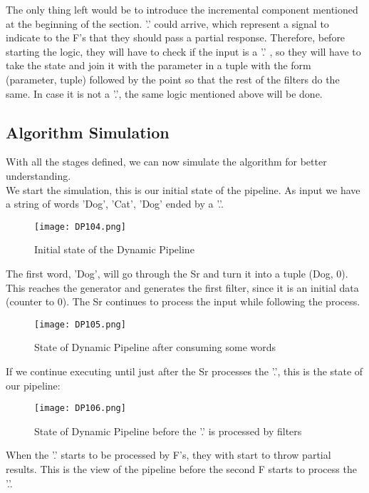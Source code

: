 The only thing left would be to introduce the incremental component mentioned at the beginning of the section.
'.' could arrive, which represent a signal to indicate to the F's that they should pass a partial response.
Therefore, before starting the logic, they will have to check if the input is a '.' , so they will have to take the state and join it with the parameter in a tuple with the form (parameter, tuple) followed by the point so that the rest of the filters do the same. In case it is not a '.', the same logic mentioned above will be done.

\subsection{Algorithm Simulation}
With all the stages defined, we can now simulate the algorithm for better understanding. \\

We start the simulation, this is our initial state of the pipeline.
As input we have a string of words 'Dog', 'Cat', 'Dog' ended by a '.'.

\begin{figure}[H]
    \centering
    \texttt{[image: DP104.png]}
    \caption{Initial state of the Dynamic Pipeline}
    \label{fig:DP104}
\end{figure}

The first word, 'Dog', will go through the Sr and turn it into a tuple (Dog, 0).
This reaches the generator and generates the first filter, since it is an initial data (counter to 0).
The Sr continues to process the input while following the process.

\begin{figure}[H]
    \centering
    \texttt{[image: DP105.png]}
    \caption{State of Dynamic Pipeline after consuming some words}
    \label{fig:DP105}
\end{figure}

If we continue executing until just after the Sr processes the '.', this is the state of our pipeline:

\begin{figure}[H]
    \centering
    \texttt{[image: DP106.png]}
    \caption{State of Dynamic Pipeline before the '.' is processed by filters}
    \label{fig:DP106}
\end{figure}

When the '.' starts to be processed by F's, they with start to throw partial results.
This is the view of the pipeline before the second F starts to process the '.'.

